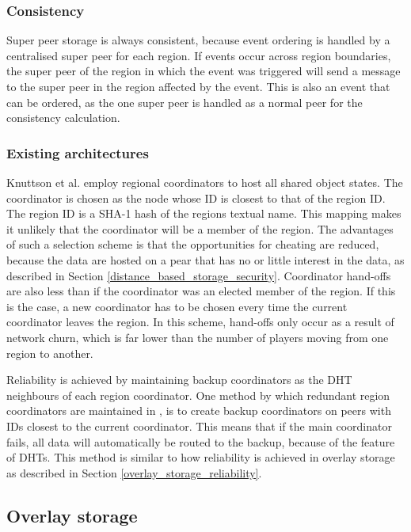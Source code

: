 \documentclass[10pt,a4paper,journal,cspaper,compsoc]{IEEEtran}
\begin{document}
\subsubsection{Consistency}
Super peer storage is always consistent, because event ordering is handled by a centralised super peer for each region. If events occur across region
boundaries, the super peer of the region in which the event was triggered will send a message to the super peer in the region affected by the event.
This is also an event that can be ordered, as the one super peer is handled as a normal peer for the consistency calculation.

\subsubsection{Existing architectures}

Knuttson et al. \cite{knutsson_p2p_first} employ regional coordinators to host all shared object states. The coordinator is chosen as the node whose
ID is closest to that of the region ID. The region ID is a SHA-1 hash of the regions textual name. This mapping makes it unlikely that the
coordinator will be a member of the region. The advantages of such a selection scheme is that the opportunities for cheating are reduced, because the
data are hosted on a pear that has no or little interest in the data, as described in Section \ref{distance_based_storage_security}. Coordinator
hand-offs are also less than if the coordinator was an elected member of the region. If this is the case, a new coordinator has to be chosen every
time the current coordinator leaves the region. In this scheme, hand-offs only occur as a result of network churn, which is far lower than the number
of players moving from one region to another.

Reliability is achieved by maintaining backup coordinators as the DHT neighbours of each region coordinator. One method by which redundant region
coordinators are maintained in \cite{knutsson_p2p_first}, is to create backup coordinators on peers with IDs closest to the current coordinator. This
means that if the main coordinator fails, all data will automatically be routed to the backup, because of the feature of DHTs. This method is similar
to how reliability is achieved in overlay storage as described in Section \ref{overlay_storage_reliability}.

\subsection{Overlay storage}
\label{overlay_storage}
\end{document}
